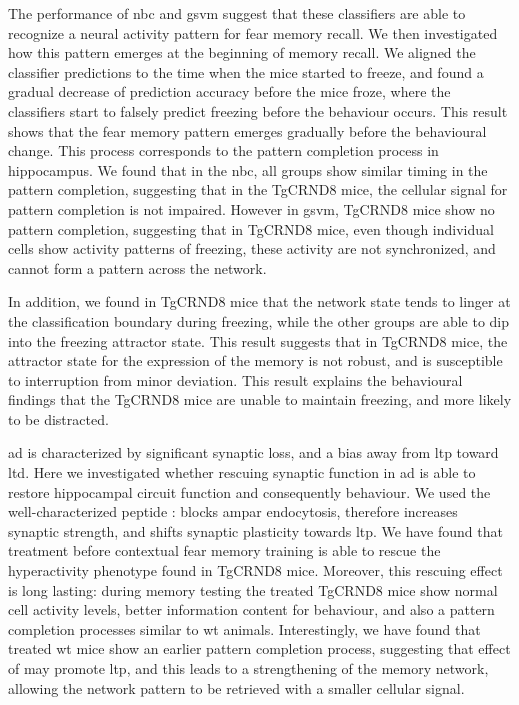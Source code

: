 The performance of \gls{nbc} and \gls{gsvm} suggest that these classifiers are able to recognize a neural activity pattern for fear memory recall. We then investigated how this pattern emerges at the beginning of memory recall. We aligned the classifier predictions to the time when the mice started to freeze, and found a gradual decrease of prediction accuracy before the mice froze, where the classifiers start to falsely predict freezing before the behaviour occurs. This result shows that the fear memory pattern emerges gradually before the behavioural change. This process corresponds to the pattern completion process in hippocampus. We found that in the \gls{nbc}, all groups show similar timing in the pattern completion, suggesting that in the TgCRND8 mice, the cellular signal for pattern completion is not impaired. However in \gls{gsvm}, TgCRND8 mice show no pattern completion, suggesting that in TgCRND8 mice, even though individual cells show activity patterns of freezing, these activity are not synchronized, and cannot form a pattern across the network. 

In addition, we found in TgCRND8 mice that the network state tends to linger at the classification boundary during freezing, while the other groups are able to dip into the freezing attractor state. This result suggests that in TgCRND8 mice, the attractor state for the expression of the memory is not robust, and is susceptible to interruption from minor deviation. This result explains the behavioural findings that the TgCRND8 mice are unable to maintain freezing, and more likely to be distracted. 

\Gls{ad} is characterized by significant synaptic loss, and a bias away from \gls{ltp} toward \gls{ltd}. Here we investigated whether rescuing synaptic function in \gls{ad} is able to restore hippocampal circuit function and consequently behaviour. We used the well-characterized peptide \tglu{}: \tglu{} blocks \gls{ampar} endocytosis, therefore increases synaptic strength, and shifts synaptic plasticity towards \gls{ltp}. We have found that \tglu{} treatment before contextual fear memory training is able to rescue the hyperactivity phenotype found in TgCRND8 mice. Moreover, this rescuing effect is long lasting: during memory testing the treated TgCRND8 mice show normal cell activity levels, better information content for behaviour, and also a pattern completion processes similar to \gls{wt} animals. Interestingly, we have found that \tglu{} treated \gls{wt} mice show an earlier pattern completion process, suggesting that effect of \tglu{} may promote \gls{ltp}, and this leads to a strengthening of the memory network, allowing the network pattern to be retrieved with a smaller cellular signal. 


